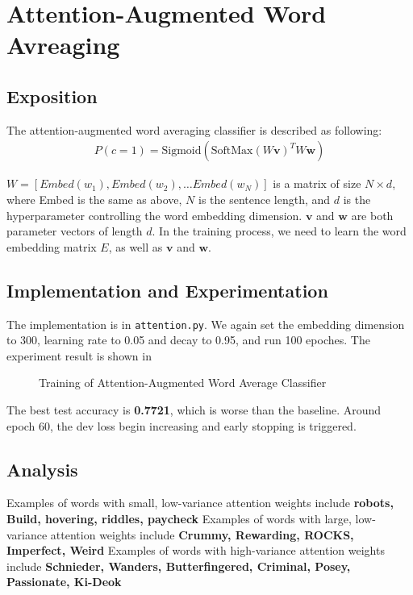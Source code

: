 \documentclass{article}
\begin{document}
\section{Attention-Augmented Word Avreaging}
\subsection{Exposition}
The attention-augmented word averaging classifier is described as following:
\begin{align}\label{formu:att}
P(c=1) = \text{Sigmoid}(\text{SoftMax}(W \textbf{v})^TW \textbf{w})
\end{align}

$W = [Embed(w_1), Embed(w_2), \ldots Embed(w_N)]$ is a matrix of size $N\times d$, where Embed is the same as above, $N$ is the sentence length, and $d$ is the hyperparameter controlling the word embedding dimension. $\textbf{v}$ and $\textbf{w}$ are both parameter vectors of length $d$. In the training process, we need to learn the word embedding matrix $E$, as well as $\textbf{v}$ and $\textbf{w}$.
\subsection{Implementation and Experimentation}
The implementation is in \texttt{attention.py}. We again set the embedding dimension to 300, learning rate to 0.05 and decay to 0.95, and run 100 epoches. The experiment result is shown in 
\begin{figure}
\centering
{}
\caption{Training of Attention-Augmented Word Average Classifier}
\label{fig:attention}
\end{figure}
The best test accuracy is \textbf{0.7721}, which is worse than the baseline. Around epoch 60, the dev loss begin increasing and early stopping is triggered.
\subsection{Analysis}
Examples of words with small, low-variance attention weights include \textbf{robots, Build, hovering, riddles, paycheck} 
Examples of words with large, low-variance attention weights include \textbf{Crummy, Rewarding, ROCKS, Imperfect, Weird}
Examples of words with high-variance attention weights include \textbf{Schnieder, Wanders, Butterfingered, Criminal, Posey, Passionate, Ki-Deok} 
\end{document}
